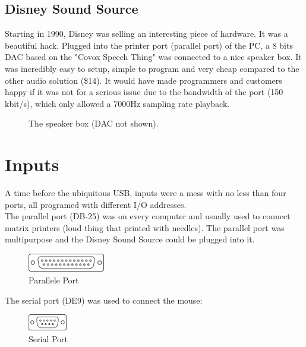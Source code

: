 \documentclass[book.tex]{subfiles}
\begin{document}
  \subsection{Disney Sound Source}
  Starting in 1990, Disney was selling an interesting piece of hardware. It was a beautiful hack. Plugged into the printer port (parallel port) of the PC, a 8 bits DAC based on the "Covox Speech Thing" was connected to a nice speaker box. It was incredibly easy to setup, simple to program and very cheap compared to the other audio solution (\$14). It would have made programmers and customers happy if it was not for a serious issue due to the bandwidth of the port (150 kbit/s), which only allowed a 7000Hz sampling rate playback.
  \par
  \begin{figure}[H] 
    \centering 
    \caption{The speaker box (DAC not shown).}
  \end{figure}








\section{Inputs}
A time before the ubiquitous USB, inputs were a mess with no less than four ports, all programed with different I/O addresses.\\

The parallel port (DB-25) was on every computer and usually used to connect matrix printers (loud thing that printed with needles). The parallel port was multipurpose and the Disney Sound Source could be plugged into it.\\
\par
 \begin{figure}[H]
\centering
\includegraphics[width=0.3\textwidth]{imgs/drawings/ports/DB-25_parallel_port.eps}
\caption{Parallele Port}
\label{fig:parallelPort}
\end{figure}


The serial port (DE9) was used to connect the mouse:
 \begin{figure}[H]
\centering
\includegraphics[width=0.15\textwidth]{imgs/drawings/ports/DE9_serial_port.eps}
\caption{Serial Port}
\label{fig:serialPort}
\end{figure}
\end{document}
